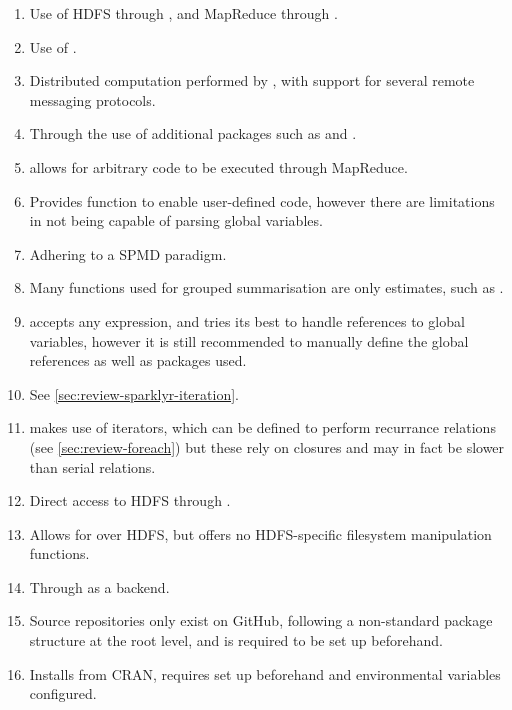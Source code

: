 \begin{enumerate}
\item\label{itm:x1} Use of HDFS through \cite{revo2013rhdfs}, and MapReduce through \cite{revo2014plyrmr}.
\item\label{itm:x2} Use of \cite{luraschi20}.
\item\label{itm:x3} Distributed computation performed by , with support for several remote messaging protocols\cites{Chen2012pbdMPIpackage,Schmidt2015pbdCSpackage}.
\item\label{itm:x4} Through the use of additional packages such as  and \cites{weston17,luraschi20}.
\item\label{itm:x5} \cite{revo2015rmr2} allows for arbitrary \R{} code to be executed through MapReduce.
\item\label{itm:x6}Provides  function to enable user-defined code, however there are limitations in not being capable of parsing global variables.
\item\label{itm:x7} Adhering to a SPMD paradigm.
\item\label{itm:x8} Many functions used for grouped summarisation are only estimates, such as \cite{zj19:_group_by}.
\item\label{itm:x9}  accepts any expression, and tries its best to handle references to global variables, however it is still recommended to manually define the global references as well as packages used.
\item\label{itm:x10} See \cref{sec:review-sparklyr-iteration}.
\item\label{itm:x11}  makes use of iterators, which can be defined to perform recurrance relations (see \cref{sec:review-foreach}) but these rely on closures and may in fact be slower than serial relations.
\item\label{itm:x12} Direct access to HDFS through \cite{revo2013rhdfs}.
\item\label{itm:x13} Allows for  over HDFS, but offers no HDFS-specific filesystem manipulation functions.
\item\label{itm:x14} Through  as a backend.
\item\label{itm:x15} Source repositories only exist on GitHub, following a non-standard package structure at the root level, and  is required to be set up beforehand.
\item\label{itm:x16} Installs from CRAN, requires  set up beforehand and environmental variables configured.

\end{enumerate}
